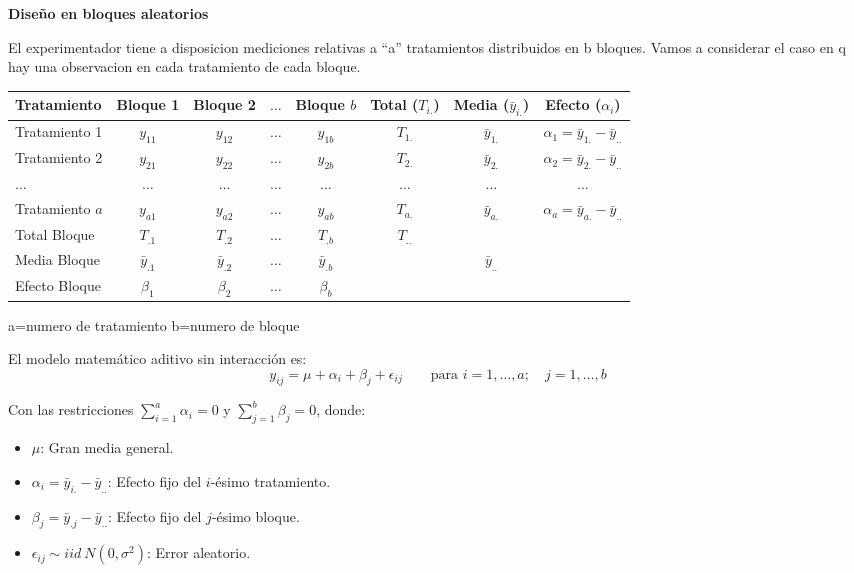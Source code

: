 \documentclass[10pt,a4paper]{article}
\begin{document}
{\large\bfseries Diseño en bloques aleatorios}
\vspace{2pt}

El experimentador tiene a disposicion mediciones relativas a ``a'' tratamientos distribuidos en b bloques. Vamos a considerar el caso en q hay una observacion en cada tratamiento de cada bloque.

\begin{center}
\vspace{-2pt}
{\small
\begin{tabular}{l c c c c | c c c}
\toprule
Tratamiento & Bloque 1 & Bloque 2 & $\ldots$ & Bloque $b$ & Total ($T_{i.}$) & Media ($\bar{y}_{i.}$) & Efecto ($\alpha_i$) \\
\midrule
Tratamiento 1 & $y_{11}$ & $y_{12}$ & $\ldots$ & $y_{1b}$ & $T_{1.}$ & $\bar{y}_{1.}$ & $\alpha_1=\bar{y}_{1.}-\bar{y}_{..}$ \\
Tratamiento 2 & $y_{21}$ & $y_{22}$ & $\ldots$ & $y_{2b}$ & $T_{2.}$ & $\bar{y}_{2.}$ & $\alpha_2=\bar{y}_{2.}-\bar{y}_{..}$ \\
$\ldots$ & $\ldots$ & $\ldots$ & $\ldots$ & $\ldots$ & $\ldots$ & $\ldots$ & $\ldots$ \\
Tratamiento $a$ & $y_{a1}$ & $y_{a2}$ & $\ldots$ & $y_{ab}$ & $T_{a.}$ & $\bar{y}_{a.}$ & $\alpha_a=\bar{y}_{a.}-\bar{y}_{..}$ \\
\midrule
Total Bloque & $T_{.1}$ & $T_{.2}$ & $\ldots$ & $T_{.b}$ & $T_{..}$ & & \\
Media Bloque & $\bar{y}_{.1}$ & $\bar{y}_{.2}$ & $\ldots$ & $\bar{y}_{.b}$ & & $\bar{y}_{..}$ & \\
Efecto Bloque & $\beta_1$ & $\beta_2$ & $\ldots$ & $\beta_b$ & & & \\
\bottomrule
\end{tabular}
}
\end{center}

\hfill {\small a=numero de tratamiento \quad b=numero de bloque}

El modelo matemático aditivo sin interacción es:
\[
y_{ij} = \mu + \alpha_i + \beta_j + \epsilon_{ij} \qquad \text{para } i=1,\ldots,a; \quad j=1,\ldots,b
\]

Con las restricciones $\sum_{i=1}^{a}\alpha_i=0$ y $\sum_{j=1}^{b}\beta_j=0$, donde:
\begin{itemize}[leftmargin=16pt,itemsep=0pt,topsep=1pt,parsep=0pt]
  \item $\mu$: Gran media general.
  \item $\alpha_i=\bar{y}_{i.}-\bar{y}_{..}$: Efecto fijo del $i$-ésimo tratamiento.
  \item $\beta_j=\bar{y}_{.j}-\bar{y}_{..}$: Efecto fijo del $j$-ésimo bloque.
  \item $\epsilon_{ij} \sim iid\ N(0,\sigma^2)$: Error aleatorio.
\end{itemize}
\end{document}
